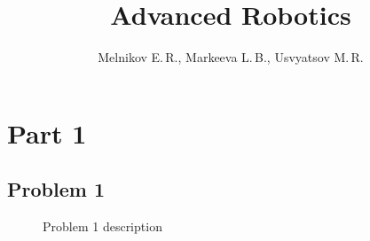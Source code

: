 \documentclass[10pt]{article}
\title{Advanced Robotics}
\author{Melnikov E.\,R., Markeeva L.\,B., Usvyatsov M.\,R.}
\begin{document}
	\maketitle
	\section{Part 1}
		\subsection{Problem 1}
			\begin{figure}[h!]
				\caption{Problem 1 description}
				\label{fig:modules}
			\end{figure}
			
\end{document}
